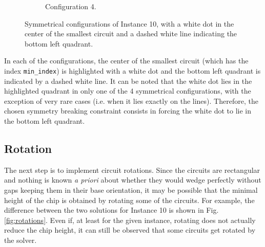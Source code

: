 \documentclass[a4paper, 12pt]{article}
\begin{document}
\begin{figure}
\begin{subfigure}[t]{0.45\textwidth}
        \caption{Configuration 4.}
    \end{subfigure}
    \caption[Symmetrical configurations.]{Symmetrical configurations of Instance 10, with a white dot in the center of the smallest circuit and a dashed white line indicating the bottom left quadrant.}
    \label{fig:solutions}  
\end{figure}

In each of the configurations, the center of the smallest circuit (which has the index \verb|min_index|) is highlighted with a white dot and the bottom left quadrant is indicated by a dashed white line. It can be noted that the white dot lies in the highlighted quadrant in only one of the 4 symmetrical configurations, with the exception of very rare cases (i.e. when it lies exactly on the lines). Therefore, the chosen symmetry breaking constraint consists in forcing the white dot to lie in the bottom left quadrant.

\subsection{Rotation}


The next step is to implement circuit rotations. Since the circuits are rectangular and nothing is known \emph{a priori} about whether they would wedge perfectly without gaps keeping them in their base orientation, it may be possible that the minimal height of the chip is obtained by rotating some of the circuits. For example, the difference between the two solutions for Instance 10 is shown in Fig. \ref{fig:rotations}. Even if, at least for the given instance, rotating does not actually reduce the chip height, it can still be observed that some circuits get rotated by the solver.
\end{document}
